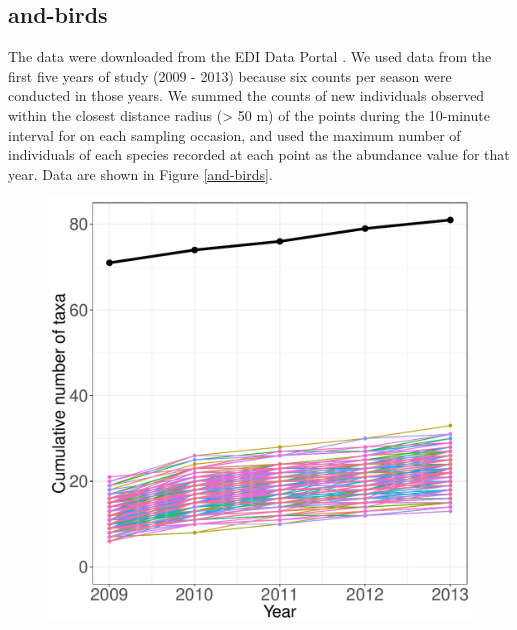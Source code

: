 \documentclass[11pt, oneside]{article}
\begin{document}
\subsection {and-birds}
The data were downloaded from the EDI Data Portal \citep{and-birds}.
We used data from the first five years of study (2009 - 2013) because six counts per season were conducted in those years.
We summed the counts of new individuals observed within the closest distance radius (> 50 m)  of the points during the 10-minute interval for on each sampling occasion, and used the maximum number of individuals of each species recorded at each point as the abundance value for that year.
Data are shown in Figure \ref{and-birds}.

\begin{figure}[h!]
\centering
\includegraphics[scale = 0.4]{and-birds-wisnoski_species_accumulation_curve.pdf}

\end{figure}
\end{document}

